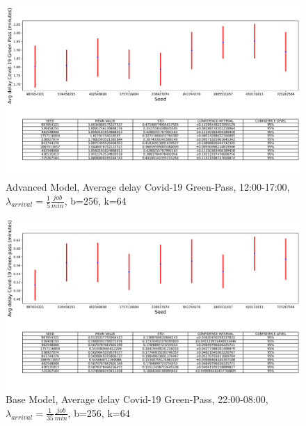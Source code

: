 \documentclass{article}
\begin{document}
\begin{figure}[H]
	\centering
	\captionsetup{justification=centering,margin=2cm}
	\includegraphics[scale=0.48]{images/adv_avg_d_covid_steady_state_aft.png}
	\caption{Advanced Model, Average delay Covid-19 Green-Pass, 12:00-17:00, $\lambda_{arrival}=\frac{1}{5} \frac{job}{min}$, b=256, k=64}\label{figura:adv_avg_d_covid_steady_state_aft}
\end{figure}

\begin{figure}[H]
	\centering
	\captionsetup{justification=centering,margin=2cm}
	\includegraphics[scale=0.48]{images/avg_d_covid_steady_state_night.png}
	\caption{Base Model, Average delay Covid-19 Green-Pass, 22:00-08:00, $\lambda_{arrival}=\frac{1}{35} \frac{job}{min}$, b=256, k=64}\label{figura:avg_d_covid_steady_state_night}
\end{figure}
\end{document}
